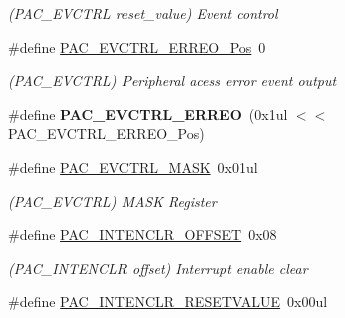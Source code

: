 \begin{DoxyCompactItemize}
\begin{DoxyCompactList}\small\item\em (P\+A\+C\+\_\+\+E\+V\+C\+T\+R\+L reset\+\_\+value) Event control \end{DoxyCompactList}\item 
\hypertarget{group___s_a_m_l21___p_a_c_ga5920713bfe0dc88ccdc65852e077e8c9}{}\#define \hyperlink{group___s_a_m_l21___p_a_c_ga5920713bfe0dc88ccdc65852e077e8c9}{P\+A\+C\+\_\+\+E\+V\+C\+T\+R\+L\+\_\+\+E\+R\+R\+E\+O\+\_\+\+Pos}~0\label{group___s_a_m_l21___p_a_c_ga5920713bfe0dc88ccdc65852e077e8c9}

\begin{DoxyCompactList}\small\item\em (P\+A\+C\+\_\+\+E\+V\+C\+T\+R\+L) Peripheral acess error event output \end{DoxyCompactList}\item 
\hypertarget{group___s_a_m_l21___p_a_c_gaa4106c53838ed3df5f093a1520ff3d3d}{}\#define {\bfseries P\+A\+C\+\_\+\+E\+V\+C\+T\+R\+L\+\_\+\+E\+R\+R\+E\+O}~(0x1ul $<$$<$ P\+A\+C\+\_\+\+E\+V\+C\+T\+R\+L\+\_\+\+E\+R\+R\+E\+O\+\_\+\+Pos)\label{group___s_a_m_l21___p_a_c_gaa4106c53838ed3df5f093a1520ff3d3d}

\item 
\hypertarget{group___s_a_m_l21___p_a_c_ga512b4c1a352ec1cdbee25ec33dddc526}{}\#define \hyperlink{group___s_a_m_l21___p_a_c_ga512b4c1a352ec1cdbee25ec33dddc526}{P\+A\+C\+\_\+\+E\+V\+C\+T\+R\+L\+\_\+\+M\+A\+S\+K}~0x01ul\label{group___s_a_m_l21___p_a_c_ga512b4c1a352ec1cdbee25ec33dddc526}

\begin{DoxyCompactList}\small\item\em (P\+A\+C\+\_\+\+E\+V\+C\+T\+R\+L) M\+A\+S\+K Register \end{DoxyCompactList}\item 
\hypertarget{group___s_a_m_l21___p_a_c_gab74ed8f7d8aa591cf1c8a49d5dd394a4}{}\#define \hyperlink{group___s_a_m_l21___p_a_c_gab74ed8f7d8aa591cf1c8a49d5dd394a4}{P\+A\+C\+\_\+\+I\+N\+T\+E\+N\+C\+L\+R\+\_\+\+O\+F\+F\+S\+E\+T}~0x08\label{group___s_a_m_l21___p_a_c_gab74ed8f7d8aa591cf1c8a49d5dd394a4}

\begin{DoxyCompactList}\small\item\em (P\+A\+C\+\_\+\+I\+N\+T\+E\+N\+C\+L\+R offset) Interrupt enable clear \end{DoxyCompactList}\item 
\hypertarget{group___s_a_m_l21___p_a_c_gaf70176d821e215c1479501941b47cb6d}{}\#define \hyperlink{group___s_a_m_l21___p_a_c_gaf70176d821e215c1479501941b47cb6d}{P\+A\+C\+\_\+\+I\+N\+T\+E\+N\+C\+L\+R\+\_\+\+R\+E\+S\+E\+T\+V\+A\+L\+U\+E}~0x00ul\label{group___s_a_m_l21___p_a_c_gaf70176d821e215c1479501941b47cb6d}


\end{DoxyCompactItemize}
